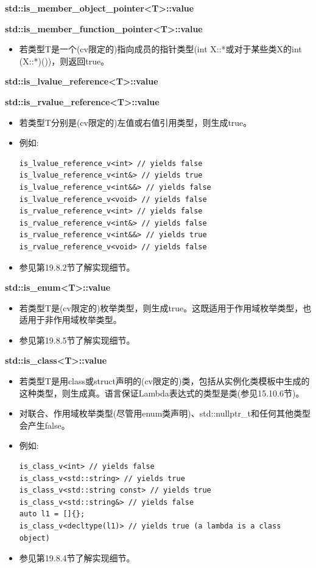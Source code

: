 \textbf{std::is\_member\_object\_pointer<T>::value}

\textbf{std::is\_member\_function\_pointer<T>::value}

\begin{itemize}
\item 
若类型T是一个(cv限定的)指向成员的指针类型(int X::*或对于某些类X的int (X::*)())，则返回true。
\end{itemize}

\textbf{std::is\_lvalue\_reference<T>::value}

\textbf{std::is\_rvalue\_reference<T>::value}

\begin{itemize}
\item 
若类型T分别是(cv限定的)左值或右值引用类型，则生成true。

\item 
例如:
\begin{lstlisting}[style=styleCXX]
is_lvalue_reference_v<int> // yields false
is_lvalue_reference_v<int&> // yields true
is_lvalue_reference_v<int&&> // yields false
is_lvalue_reference_v<void> // yields false
is_rvalue_reference_v<int> // yields false
is_rvalue_reference_v<int&> // yields false
is_rvalue_reference_v<int&&> // yields true
is_rvalue_reference_v<void> // yields false
\end{lstlisting}

\item 
参见第19.8.2节了解实现细节。
\end{itemize}

\textbf{std::is\_enum<T>::value}

\begin{itemize}
\item 
若类型T是(cv限定的)枚举类型，则生成true。这既适用于作用域枚举类型，也适用于非作用域枚举类型。

\item 
参见第19.8.5节了解实现细节。
\end{itemize}

\textbf{std::is\_class<T>::value}

\begin{itemize}
\item 
若类型T是用class或struct声明的(cv限定的)类，包括从实例化类模板中生成的这种类型，则生成真。语言保证Lambda表达式的类型是类(参见15.10.6节)。

\item 
对联合、作用域枚举类型(尽管用enum类声明)、std::nullptr\_t和任何其他类型会产生false。

\item 
例如:
\begin{lstlisting}[style=styleCXX]
is_class_v<int> // yields false
is_class_v<std::string> // yields true
is_class_v<std::string const> // yields true
is_class_v<std::string&> // yields false
auto l1 = []{};
is_class_v<decltype(l1)> // yields true (a lambda is a class object)
\end{lstlisting}

\item 
参见第19.8.4节了解实现细节。
\end{itemize}

